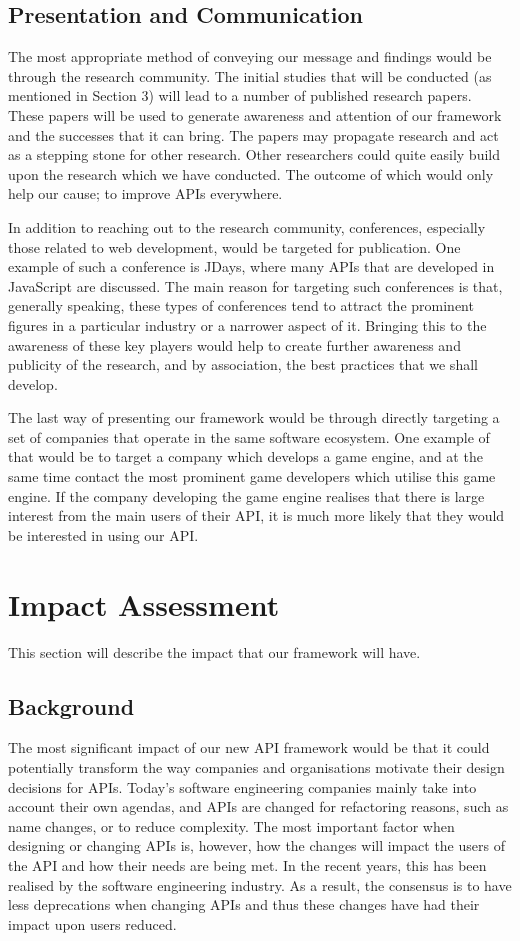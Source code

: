 \documentclass{article}
\begin{document}
\subsection{Presentation and Communication}
The most appropriate method of conveying our message and findings would be through the research community. The initial studies that will be conducted (as mentioned in Section 3) will lead to a number of published research papers. These papers will be used to generate awareness and attention of our framework and the successes that it can bring. The papers may propagate research and act as a stepping stone for other research. Other researchers could quite easily build upon the research which we have conducted. The outcome of which would only help our cause; to improve APIs everywhere. 

In addition to reaching out to the research community, conferences, especially those related to web development, would be targeted for publication. One example of such a conference is JDays, where many APIs that are developed in JavaScript are discussed. The main reason for targeting such conferences is that, generally speaking, these types of conferences tend to attract the prominent figures in a particular industry or a narrower aspect of it. Bringing this to the awareness of these key players would help to create further awareness and publicity of the research, and by association, the best practices that we shall develop.

The last way of presenting our framework would be through directly targeting a set of companies that operate in the same software ecosystem. One example of that would be to target a company which develops a game engine, and at the same time contact the most prominent game developers which utilise this game engine. If the company developing the game engine realises that there is large interest from the main users of their API, it is much more likely that they would be interested in using our API. 


\section{Impact Assessment}
This section will describe the impact that our framework will have. 

\subsection{Background}
The most significant impact of our new API framework would be that it could potentially transform the way companies and organisations motivate their design decisions for APIs. Today's software engineering companies mainly take into account their own agendas, and APIs are changed for refactoring reasons, such as name changes, or to reduce complexity. The most important factor when designing or changing APIs is, however, how the changes will impact the users of the API and how their needs are being met. In the recent years, this has been realised by the software engineering industry. As a result, the consensus is to have less deprecations when changing APIs and thus these changes have had their impact upon users reduced. 
\end{document}
